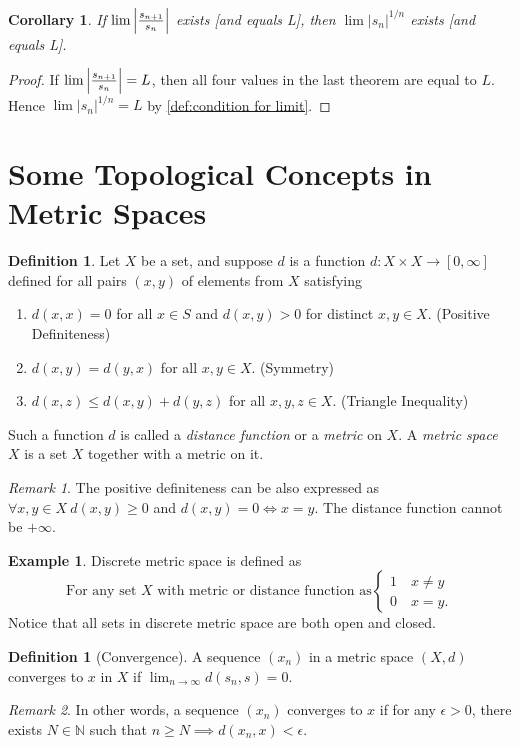 \documentclass[12pt, lettersize]{book}
\theoremstyle{plain}
\newtheorem{cor}{Corollary}[thm]
\theoremstyle{definition}
\newtheorem{dfn}[thm]{Definition}
\newtheorem*{eg}{Example}
\theoremstyle{remark}
\newtheorem*{rem}{Remark}
\newcommand{\N}{\mathbb{N}}
\begin{document}
		\begin{cor}\label{def:12.3}
		If $\lim\abs{\frac{s_{n+1}}{s_n}}$ exists [and equals L], then $\lim|s_n|^{1/n}$ exists [and equals L].
		\end{cor}
		\begin{proof}
		If $\lim\abs{\frac{s_{n+1}}{s_n}}=L$, then all four values in the last theorem are equal to $L$. Hence
		$\lim|s_n|^{1/n}=L$ by \ref{def:condition for limit}.
		\end{proof}
		\newpage
	\section{Some Topological Concepts in Metric Spaces}
		\begin{dfn}
		Let $X$ be a set, and suppose $d$ is a function $d: X\times X\rightarrow[0,\infty]$ defined for all pairs $(x,y)$ of elements from $X$ satisfying
		\begin{enumerate}
			\item $d(x,x)=0$ for all $x\in S$ and $d(x,y)>0$ for distinct $x,y\in X$. (Positive Definiteness)
			\item $d(x,y)=d(y,x)$ for all $x,y\in X$. (Symmetry)
			\item $d(x,z)\leq d(x,y)+d(y,z)$ for all $x,y,z\in X$. (Triangle Inequality)
		\end{enumerate}
		Such a function $d$ is called a \emph{distance function} or a \emph{metric} on $X$. A \emph{metric space} $X$ is a set $X$ together with a metric on it.
		\end{dfn}
		\begin{rem}
		The positive definiteness can be also expressed as $\forall x,y\in X\ d(x,y)\geq 0$ and $d(x,y)=0\iff x=y$. The distance function cannot be $+\infty$.
		\end{rem}
		\begin{eg}
		Discrete metric space is defined as
		\begin{displaymath}
			\text{For any set $X$ with metric or distance function as}\begin{cases}
				1\quad\text{$x\neq y$}\\ 0\quad\text{$x=y$}.
			\end{cases}
		\end{displaymath}
		Notice that all sets in discrete metric space are both open and closed.
		\end{eg}
		
		\begin{dfn}[Convergence]
		A sequence $(x_n)$ in a metric space $(X,d)$ converges to $x$ in $X$ if $\lim_{n\rightarrow\infty}d(s_n,s)=0$.
		\end{dfn}
		\begin{rem}
		In other words, a sequence $(x_n)$ converges to $x$ if for any $\epsilon>0$, there exists $N\in\N$ such that $n\geq N\implies d(x_n,x)<\epsilon$.
		\end{rem}
		
\end{document}
